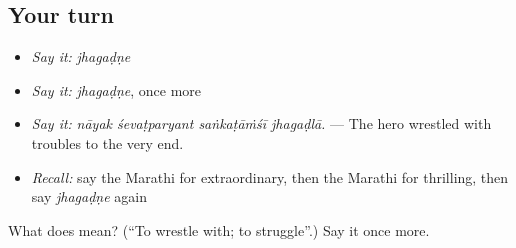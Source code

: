 \subsection*{Your turn}
\begin{itemize}
\raggedright
  \item \emph{Say it:} \emph{jhagaḍṇe}
  \item \emph{Say it:} \emph{jhagaḍṇe}, once more
  \item \emph{Say it:} \emph{nāyak śevaṭparyant saṅkaṭāṁśī jhagaḍlā.} — The hero wrestled with troubles to the very end.
  \item \emph{Recall:} say the Marathi for extraordinary, then the Marathi for thrilling, then say \emph{jhagaḍṇe} again
\end{itemize}

\begin{tcolorbox}[breakable,colback=teal!4,colframe=teal!35!black,title={Before you move on}]
What does  mean? (\textquotedblleft{}To wrestle with; to struggle\textquotedblright{}.) Say it once more.
\end{tcolorbox}
